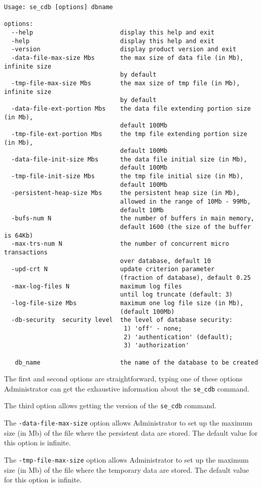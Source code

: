 \documentclass[a4paper,12pt]{article}
\begin{document}
\begin{verbatim}
Usage: se_cdb [options] dbname

options:
  --help		 				display this help and exit
  -help							display this help and exit
  -version						display product version and exit
  -data-file-max-size Mbs		the max size of data file (in Mb), infinite size
								by default
  -tmp-file-max-size Mbs		the max size of tmp file (in Mb), infinite size
								by default
  -data-file-ext-portion Mbs	the data file extending portion size (in Mb),
								default 100Mb
  -tmp-file-ext-portion Mbs		the tmp file extending portion size (in Mb),
								default 100Mb
  -data-file-init-size Mbs		the data file initial size (in Mb),
								default 100Mb
  -tmp-file-init-size Mbs		the tmp file initial size (in Mb),
								default 100Mb
  -persistent-heap-size Mbs		the persistent heap size (in Mb),
								allowed in the range of 10Mb - 99Mb,
								default 10Mb
  -bufs-num N					the number of buffers in main memory,
								default 1600 (the size of the buffer is 64Kb)
  -max-trs-num N				the number of concurrent micro transactions
								over database, default 10
  -upd-crt N					update criterion parameter
								(fraction of database), default 0.25
  -max-log-files N              maximum log files
                                until log truncate (default: 3)
  -log-file-size Mbs            maximum one log file size (in Mb),
                                (default 100Mb)
  -db-security  security level  the level of database security:
								 1) 'off' - none;
								 2) 'authentication' (default);
								 3) 'authorization'

   db_name   					the name of the database to be created
\end{verbatim}


The first and second options are straightforward, typing one of these options Administrator can get the exhaustive information about the \verb!se_cdb! command.

The third option allows getting the version of the \verb!se_cdb! command.

The \verb!-data-file-max-size! option allows Administrator to set up the maximum size (in Mb) of the file where the persistent data are stored. The default value for this option is infinite.

The \verb!-tmp-file-max-size! option allows Administrator to set up the maximum size (in Mb) of the file where the temporary data are stored. The default value for this option is infinite.
\end{document}
